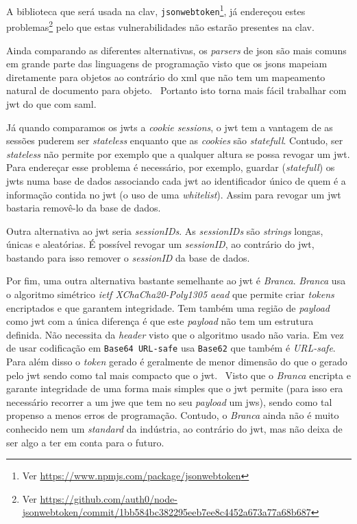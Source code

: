 A biblioteca que será usada na \acrshort{clav}, \texttt{jsonwebtoken}\footnote{Ver \url{https://www.npmjs.com/package/jsonwebtoken}}, já endereçou estes problemas\footnote{Ver \url{https://github.com/auth0/node-jsonwebtoken/commit/1bb584bc382295eeb7ee8c4452a673a77a68b687}} pelo que estas vulnerabilidades não estarão presentes na \acrshort{clav}.

Ainda comparando as diferentes alternativas, os \textit{parsers} de \acrshort{json} são mais comuns em grande parte das linguagens de programação visto que os \acrshort{json}s mapeiam diretamente para objetos ao contrário do \acrshort{xml} que não tem um mapeamento natural de documento para objeto.~\cite{jwtio} Portanto isto torna mais fácil trabalhar com \acrshort{jwt} do que com \acrshort{saml}.

Já quando comparamos os \acrshort{jwt}s a \textit{cookie sessions}, o \acrshort{jwt} tem a vantagem de as sessões puderem ser \textit{stateless} enquanto que as \textit{cookies} são \textit{statefull}. Contudo, ser \textit{stateless} não permite por exemplo que a qualquer altura se possa revogar um \acrshort{jwt}. Para endereçar esse problema é necessário, por exemplo, guardar (\textit{statefull}) os \acrshort{jwt}s numa base de dados associando cada \acrshort{jwt} ao identificador único de quem é a informação contida no \acrshort{jwt} (o uso de uma \textit{whitelist}). Assim para revogar um \acrshort{jwt} bastaria removê-lo da base de dados.

Outra alternativa ao \acrshort{jwt} seria \textit{sessionIDs}. As \textit{sessionIDs} são \textit{strings} longas, únicas e aleatórias. É possível revogar um \textit{sessionID}, ao contrário do \acrshort{jwt}, bastando para isso remover o \textit{sessionID} da base de dados.

Por fim, uma outra alternativa bastante semelhante ao \acrshort{jwt} é \textit{Branca}. \textit{Branca} usa o algoritmo simétrico \textit{\acrshort{ietf} XChaCha20-Poly1305 \acrshort{aead}} que permite criar \textit{tokens} encriptados e que garantem integridade. Tem também uma região de \textit{payload} como \acrshort{jwt} com a única diferença é que este \textit{payload} não tem um estrutura definida. Não necessita da \textit{header} visto que o algoritmo usado não varia. Em vez de usar codificação em \texttt{Base64 URL-safe} usa \texttt{Base62} que também é \textit{URL-safe}. Para além disso o \textit{token} gerado é geralmente de menor dimensão do que o gerado pelo \acrshort{jwt} sendo como tal mais compacto que o \acrshort{jwt}.~\cite{branca} Visto que o \textit{Branca} encripta e garante integridade de uma forma mais simples que o \acrshort{jwt} permite (para isso era necessário recorrer a um \acrshort{jwe} que tem no seu \textit{payload} um \acrshort{jws}), sendo como tal propenso a menos erros de programação. Contudo, o \textit{Branca} ainda não é muito conhecido nem um \textit{standard} da indústria, ao contrário do \acrshort{jwt}, mas não deixa de ser algo a ter em conta para o futuro. 

